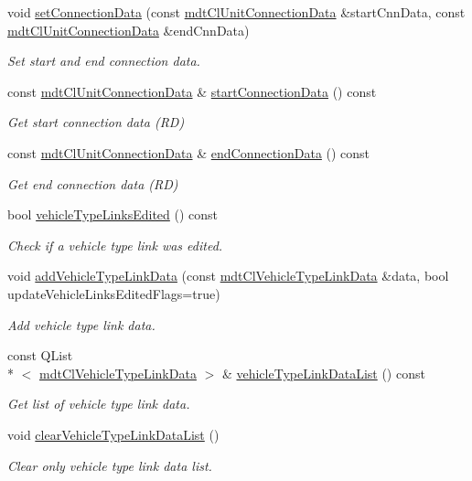 \begin{DoxyCompactItemize}
void \hyperlink{classmdt_cl_link_data_af973898eb4ffe8c97f3267c99e97721b}{set\-Connection\-Data} (const \hyperlink{classmdt_cl_unit_connection_data}{mdt\-Cl\-Unit\-Connection\-Data} \&start\-Cnn\-Data, const \hyperlink{classmdt_cl_unit_connection_data}{mdt\-Cl\-Unit\-Connection\-Data} \&end\-Cnn\-Data)
\begin{DoxyCompactList}\small\item\em Set start and end connection data. \end{DoxyCompactList}\item 
const \hyperlink{classmdt_cl_unit_connection_data}{mdt\-Cl\-Unit\-Connection\-Data} \& \hyperlink{classmdt_cl_link_data_a571eacbdeb58564b340a1adce8b5541f}{start\-Connection\-Data} () const 
\begin{DoxyCompactList}\small\item\em Get start connection data (R\-D) \end{DoxyCompactList}\item 
const \hyperlink{classmdt_cl_unit_connection_data}{mdt\-Cl\-Unit\-Connection\-Data} \& \hyperlink{classmdt_cl_link_data_ae61b648f3a8b1461e06815b8ca6017f4}{end\-Connection\-Data} () const 
\begin{DoxyCompactList}\small\item\em Get end connection data (R\-D) \end{DoxyCompactList}\item 
bool \hyperlink{classmdt_cl_link_data_a6ba85d372cd9d1478b1a3cfe1e76b6c6}{vehicle\-Type\-Links\-Edited} () const 
\begin{DoxyCompactList}\small\item\em Check if a vehicle type link was edited. \end{DoxyCompactList}\item 
void \hyperlink{classmdt_cl_link_data_a39127d05ef1bec680c446a5b19242a11}{add\-Vehicle\-Type\-Link\-Data} (const \hyperlink{classmdt_cl_vehicle_type_link_data}{mdt\-Cl\-Vehicle\-Type\-Link\-Data} \&data, bool update\-Vehicle\-Links\-Edited\-Flags=true)
\begin{DoxyCompactList}\small\item\em Add vehicle type link data. \end{DoxyCompactList}\item 
const Q\-List\\*
$<$ \hyperlink{classmdt_cl_vehicle_type_link_data}{mdt\-Cl\-Vehicle\-Type\-Link\-Data} $>$ \& \hyperlink{classmdt_cl_link_data_a95fb259075bacba89d4519ac7678b70e}{vehicle\-Type\-Link\-Data\-List} () const 
\begin{DoxyCompactList}\small\item\em Get list of vehicle type link data. \end{DoxyCompactList}\item 
void \hyperlink{classmdt_cl_link_data_a04872523d8d231ddc38da34fd488ad26}{clear\-Vehicle\-Type\-Link\-Data\-List} ()
\begin{DoxyCompactList}\small\item\em Clear only vehicle type link data list. \end{DoxyCompactList}\end{DoxyCompactItemize}
